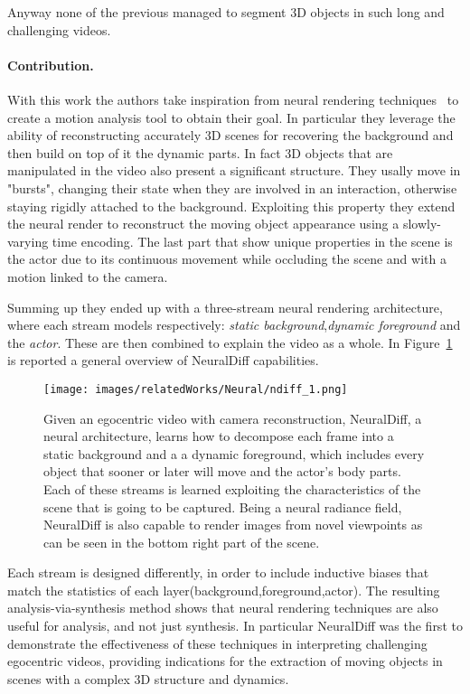 Anyway none of the previous managed to segment 3D objects in such long and challenging videos.

\paragraph{Contribution.}With this work the authors take inspiration from neural rendering techniques~\cite{nerf}
to create a motion analysis tool to obtain their goal. In particular they leverage the
ability of reconstructing accurately 3D scenes for recovering the background and then build
on top of it the dynamic parts. In fact 3D objects that are manipulated in the video also
present a significant structure. They usally move in "bursts", changing their state
when they are involved in an interaction, otherwise staying rigidly attached to the 
background. Exploiting this property  they extend the neural render to reconstruct
the moving object appearance using a slowly-varying time encoding. The last part that 
show unique properties in the scene is the actor due to its continuous movement
while occluding the scene and with a motion linked to the camera.

Summing up they ended up with a three-stream neural rendering architecture, where each stream
models respectively: \textit{static background},\textit{dynamic foreground} and
the \textit{actor}. These are then combined to explain the video as a whole. In Figure~\ref{fig:ndiff_1}
is reported a general overview of NeuralDiff capabilities.
\begin{figure}[t]
    \centering
    \texttt{[image: images/relatedWorks/Neural/ndiff\_1.png]} 
    \caption{Given an egocentric video with camera reconstruction, NeuralDiff, a neural
    architecture, learns how to decompose each frame into a static background
    and a a dynamic foreground, which includes every object that sooner or later will move
    and the actor's body parts. Each of these streams is learned exploiting the characteristics
    of the scene that is going to be captured. Being a neural radiance field, NeuralDiff is 
    also capable to render images from novel viewpoints as can be seen in the bottom right part
    of the scene.}\label{fig:ndiff_1}
\end{figure}

Each stream is designed differently, in order to include inductive biases that match the statistics
of each layer(background,foreground,actor). The resulting analysis-via-synthesis method
shows that neural rendering techniques are also useful for analysis, and not just synthesis.
In particular NeuralDiff was the first to demonstrate the effectiveness of these techniques
in interpreting challenging egocentric videos, providing indications for the extraction of moving
objects in scenes with a complex 3D structure and dynamics.

